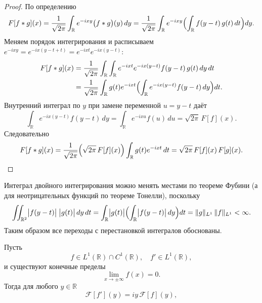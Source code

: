 \begin{proof}
По определению
\[
 F[f*g](x)
=\frac1{\sqrt{2\pi}}\int_{\mathbb R}e^{-i x y}\bigl(f*g\bigr)(y)\,dy
=\frac1{\sqrt{2\pi}}\int_{\mathbb R}e^{-i x y}
\Bigl(\int_{\mathbb R}f(y-t)\,g(t)\,dt\Bigr)dy.
\]
Меняем порядок интегрирования и расписываем
$e^{-i x y}=e^{-i x (y-t+t)}=e^{-i x t}e^{-i x (y-t)}$:
\begin{align*}
 F[f*g](x)
&=\frac1{\sqrt{2\pi}}
\int_{\mathbb R}\int_{\mathbb R}e^{-i x t}e^{-i x (y-t)}f(y-t)\,g(t)\,dy\,dt\\
&=\frac1{\sqrt{2\pi}}
\int_{\mathbb R}g(t)e^{-i x t}
\Bigl(\int_{\mathbb R}e^{-i x (y-t)}f(y-t)\,dy\Bigr)dt.
\end{align*}
Внутренний интеграл по $y$ при замене переменной $u=y-t$ даёт
\[
\int_{\mathbb R}e^{-i x (y-t)}f(y-t)\,dy
=\int_{\mathbb R}e^{-i x u}f(u)\,du
=\sqrt{2\pi}\, F[f](x).
\]
Следовательно
\[
 F[f*g](x)
=\frac1{\sqrt{2\pi}}\Bigl(\sqrt{2\pi}\, F[f](x)\Bigr)
\int_{\mathbb R}g(t)e^{-i x t}\,dt
=\sqrt{2\pi}\, F[f](x)\, F[g](x).
\]
\end{proof}
\begin{note}
    Интеграл двойного интегрирования можно менять местами по теореме Фубини (а для неотрицательных функций по теореме Тонелли), поскольку
\[
\iint_{\mathbb R^2}\bigl|f(y-t)\bigr|\;\bigl|g(t)\bigr|\,dy\,dt
=\int_{\mathbb R}\bigl|g(t)\bigr|\Bigl(\int_{\mathbb R}\bigl|f(y-t)\bigr|\,dy\Bigr)dt
=\|g\|_{L^1}\,\|f\|_{L^1}<\infty.
\]
Таким образом все переходы с перестановкой интегралов обоснованы.
\end{note}



\begin{theorem}
Пусть 
\[
f\in L^1(\mathbb R)\cap C^1(\mathbb R), 
\quad f'\in L^1(\mathbb R),
\]
и существуют конечные пределы
\[
\lim_{x\to\pm\infty}f(x)=0.
\]
Тогда для любого $y\in\mathbb R$
\[
\mathcal F[f'](y)
= i y\,\mathcal F[f](y),
\]

\end{theorem}

